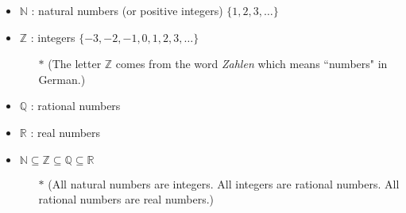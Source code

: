 \documentclass[]{report}
\begin{document}
		\begin{itemize}
			\item $\mathbb{N}$ : natural numbers (or positive integers) $\{1,2,3,\ldots\}$
			\item $\mathbb{Z}$ : integers $\{-3,-2,-1,0,1,2,3,\ldots\}$
			\begin{itemize}
				\item[$\ast$] (The letter $\mathbb{Z}$ comes from the word \emph{Zahlen} which means ``numbers" in German.)
			\end{itemize}
			\item $\mathbb{Q}$ : rational numbers
			\item $\mathbb{R}$ : real numbers
			\item $\mathbb{N} \subseteq \mathbb{Z } \subseteq \mathbb{Q} \subseteq \mathbb{R}$
			\begin{itemize}
				\item[$\ast$] (All natural numbers are integers. All integers are rational numbers. All rational numbers are real numbers.)
			\end{itemize}
					\end{itemize}
					




\end{document}
